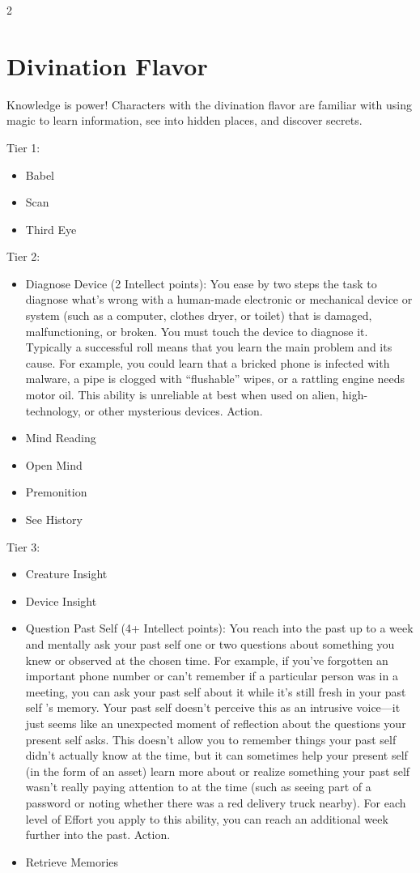 \begin{multicols}{2}
\section{Divination Flavor} 

Knowledge is power! Characters with the divination flavor are familiar with using magic to learn information, see into hidden places, and discover secrets.

Tier 1:
\begin{itemize}
\item Babel 
\item Scan 
\item Third Eye 
\end{itemize}

Tier 2:
\begin{itemize}
\item Diagnose Device (2 Intellect points): You ease by two steps the task to diagnose what’s wrong with a human-made electronic or mechanical device or system (such as a computer, clothes dryer, or toilet) that is damaged, malfunctioning, or broken. You must touch the device to diagnose it. Typically a successful roll means that you learn the main problem and its cause. For example, you could learn that a bricked phone is infected with malware, a pipe is clogged with “flushable” wipes, or a rattling engine needs motor oil. This ability is unreliable at best when used on alien, high-technology, or other mysterious devices. Action. 
\item Mind Reading 
\item Open Mind 
\item Premonition 
\item See History 
\end{itemize}

Tier 3:
\begin{itemize}
\item Creature Insight 
\item Device Insight 
\item Question Past Self (4+ Intellect points): You reach into the past up to a week and mentally ask your past self one or two questions about something you knew or observed at the chosen time. For example, if you’ve forgotten an important phone number or can’t remember if a particular person was in a meeting, you can ask your past self about it while it’s still fresh in your past self ’s memory. Your past self doesn’t perceive this as an intrusive voice—it just seems like an unexpected moment of reflection about the questions your present self asks. This doesn’t allow you to remember things your past self didn’t actually know at the time, but it can sometimes help your present self (in the form of an asset) learn more about or realize something your past self wasn’t really paying attention to at the time (such as seeing part of a password or noting whether there was a red delivery truck nearby). For each level of Effort you apply to this ability, you can reach an additional week further into the past. Action. 
\item Retrieve Memories
\end{itemize}



\end{multicols}
